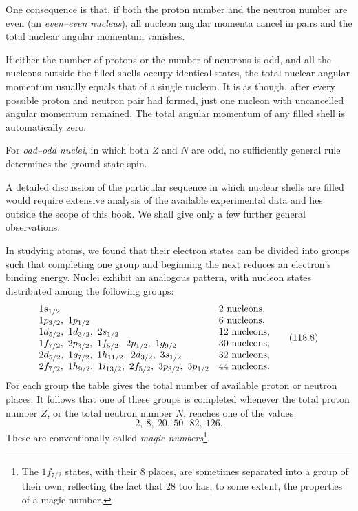 One consequence is that, if both the proton number and the neutron number are
even (an \emph{even--even nucleus}), all nucleon angular momenta cancel in
pairs and the total nuclear angular momentum vanishes.

If either the number of protons or the number of neutrons is odd, and all the
nucleons outside the filled shells occupy identical states, the total nuclear
angular momentum usually equals that of a single nucleon. It is as though,
after every possible proton and neutron pair had formed, just one nucleon with
uncancelled angular momentum remained. The total angular momentum of any
filled shell is automatically zero.

For \emph{odd--odd nuclei}, in which both $Z$ and $N$ are odd, no sufficiently
general rule determines the ground-state spin.

A detailed discussion of the particular sequence in which nuclear shells are
filled would require extensive analysis of the available experimental data
and lies outside the scope of this book. We shall give only a few further
general observations.

In studying atoms, we found that their electron states can be divided into
groups such that completing one group and beginning the next reduces an
electron's binding energy. Nuclei exhibit an analogous pattern, with nucleon
states distributed among the following groups:
\begin{equation}
 \begin{array}{@{}ll@{}}
  1s_{1/2} & 2\text{ nucleons},\\
  1p_{3/2},\ 1p_{1/2} & 6\text{ nucleons},\\
  1d_{5/2},\ 1d_{3/2},\ 2s_{1/2} & 12\text{ nucleons},\\
  1f_{7/2},\ 2p_{3/2},\ 1f_{5/2},\ 2p_{1/2},\ 1g_{9/2}
    & 30\text{ nucleons},\\
  2d_{5/2},\ 1g_{7/2},\ 1h_{11/2},\ 2d_{3/2},\ 3s_{1/2}
    & 32\text{ nucleons},\\
  2f_{7/2},\ 1h_{9/2},\ 1i_{13/2},\ 2f_{5/2},\ 3p_{3/2},\ 3p_{1/2}
    & 44\text{ nucleons}.
 \end{array}
 \tag{118.8}
\end{equation}
For each group the table gives the total number of available proton or neutron
places. It follows that one of these groups is completed whenever the total
proton number $Z$, or the total neutron number $N$, reaches one of the values
\[
 2,\ 8,\ 20,\ 50,\ 82,\ 126.
\]
These are conventionally called \emph{magic numbers}\footnote{The
$1f_{7/2}$ states, with their 8 places, are sometimes separated into a group
of their own, reflecting the fact that 28 too has, to some extent, the
properties of a magic number.}.

